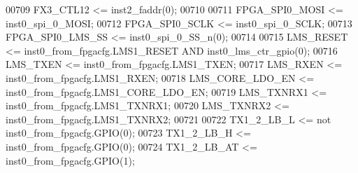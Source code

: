 \begin{DoxyCode}
00709    \textcolor{vhdlchar}{FX3_CTL12}         \textcolor{vhdlchar}{<=} \textcolor{vhdlchar}{inst2_faddr}\textcolor{vhdlchar}{(}\textcolor{vhdllogic}{}\textcolor{vhdllogic}{0}\textcolor{vhdlchar}{)};
00710    
00711    \textcolor{vhdlchar}{FPGA_SPI0_MOSI}    \textcolor{vhdlchar}{<=} \textcolor{vhdlchar}{inst0_spi_0_MOSI};
00712    \textcolor{vhdlchar}{FPGA_SPI0_SCLK}    \textcolor{vhdlchar}{<=} \textcolor{vhdlchar}{inst0_spi_0_SCLK};
00713    \textcolor{vhdlchar}{FPGA_SPI0_LMS_SS}  \textcolor{vhdlchar}{<=} \textcolor{vhdlchar}{inst0_spi_0_SS_n}\textcolor{vhdlchar}{(}\textcolor{vhdllogic}{}\textcolor{vhdllogic}{0}\textcolor{vhdlchar}{)};
00714    
00715    \textcolor{vhdlchar}{LMS_RESET}         \textcolor{vhdlchar}{<=} \textcolor{vhdlchar}{inst0_from_fpgacfg}\textcolor{vhdlchar}{.}\textcolor{vhdlchar}{LMS1_RESET} \textcolor{keywordflow}{AND} \textcolor{vhdlchar}{inst0_lms_ctr_gpio}\textcolor{vhdlchar}{(}\textcolor{vhdllogic}{}\textcolor{vhdllogic}{0}\textcolor{vhdlchar}{)};
00716    \textcolor{vhdlchar}{LMS_TXEN}          \textcolor{vhdlchar}{<=} \textcolor{vhdlchar}{inst0_from_fpgacfg}\textcolor{vhdlchar}{.}\textcolor{vhdlchar}{LMS1_TXEN};
00717    \textcolor{vhdlchar}{LMS_RXEN}          \textcolor{vhdlchar}{<=} \textcolor{vhdlchar}{inst0_from_fpgacfg}\textcolor{vhdlchar}{.}\textcolor{vhdlchar}{LMS1_RXEN};
00718    \textcolor{vhdlchar}{LMS_CORE_LDO_EN}   \textcolor{vhdlchar}{<=} \textcolor{vhdlchar}{inst0_from_fpgacfg}\textcolor{vhdlchar}{.}\textcolor{vhdlchar}{LMS1_CORE_LDO_EN};
00719    \textcolor{vhdlchar}{LMS_TXNRX1}        \textcolor{vhdlchar}{<=} \textcolor{vhdlchar}{inst0_from_fpgacfg}\textcolor{vhdlchar}{.}\textcolor{vhdlchar}{LMS1_TXNRX1};
00720    \textcolor{vhdlchar}{LMS_TXNRX2}        \textcolor{vhdlchar}{<=} \textcolor{vhdlchar}{inst0_from_fpgacfg}\textcolor{vhdlchar}{.}\textcolor{vhdlchar}{LMS1_TXNRX2};
00721    
00722    \textcolor{vhdlchar}{TX1_2_LB_L}        \textcolor{vhdlchar}{<=} \textcolor{keywordflow}{not} \textcolor{vhdlchar}{inst0_from_fpgacfg}\textcolor{vhdlchar}{.}\textcolor{vhdlchar}{GPIO}\textcolor{vhdlchar}{(}\textcolor{vhdllogic}{}\textcolor{vhdllogic}{0}\textcolor{vhdlchar}{)};
00723    \textcolor{vhdlchar}{TX1_2_LB_H}        \textcolor{vhdlchar}{<=} \textcolor{vhdlchar}{inst0_from_fpgacfg}\textcolor{vhdlchar}{.}\textcolor{vhdlchar}{GPIO}\textcolor{vhdlchar}{(}\textcolor{vhdllogic}{}\textcolor{vhdllogic}{0}\textcolor{vhdlchar}{)};
00724    \textcolor{vhdlchar}{TX1_2_LB_AT}       \textcolor{vhdlchar}{<=} \textcolor{vhdlchar}{inst0_from_fpgacfg}\textcolor{vhdlchar}{.}\textcolor{vhdlchar}{GPIO}\textcolor{vhdlchar}{(}\textcolor{vhdllogic}{}\textcolor{vhdllogic}{1}\textcolor{vhdlchar}{)};

\end{DoxyCode}
